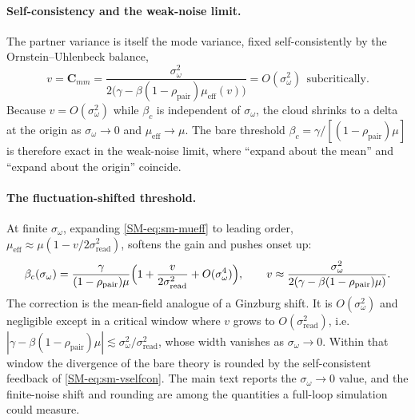 \documentclass[
  aps,prx,
  preprint,
  superscriptaddress,
  nofootinbib
]{revtex4-2}
\newcommand{\C}{\mathbf{C}}
\newcommand{\sread}{\sigma_{\mathrm{read}}}
\newcommand{\sidn}{\sigma_{\omega}}
\begin{document}
\paragraph{Self-consistency and the weak-noise limit.} The partner variance is itself the mode variance, fixed self-consistently by the Ornstein--Uhlenbeck balance,
\begin{equation}\label{SM-eq:sm-vselfcon}
v=\C_{mm}=\frac{\sidn^2}{2\bigl(\gamma-\beta(1-\rho_{\mathrm{pair}})\mu_{\mathrm{eff}}(v)\bigr)}=O(\sidn^2)\ \ \text{subcritically.}
\end{equation}
Because $v=O(\sidn^2)$ while $\beta_c$ is independent of $\sidn$, the cloud shrinks to a delta at the origin as $\sidn\to0$ and $\mu_{\mathrm{eff}}\to\mu$. The bare threshold $\beta_c=\gamma/[(1-\rho_{\mathrm{pair}})\mu]$ is therefore exact in the weak-noise limit, where ``expand about the mean'' and ``expand about the origin'' coincide.

\paragraph{The fluctuation-shifted threshold.} At finite $\sidn$, expanding \cref{SM-eq:sm-mueff} to leading order, $\mu_{\mathrm{eff}}\approx\mu(1-v/2\sread^2)$, softens the gain and pushes onset up:
\begin{equation}\label{SM-eq:sm-shift}
\beta_c(\sidn)=\frac{\gamma}{(1-\rho_{\mathrm{pair}})\mu}\Bigl(1+\frac{v}{2\sread^2}+O(\sidn^4)\Bigr),\qquad v\approx\frac{\sidn^2}{2(\gamma-\beta(1-\rho_{\mathrm{pair}})\mu)}.
\end{equation}
The correction is the mean-field analogue of a Ginzburg shift. It is $O(\sidn^2)$ and negligible except in a critical window where $v$ grows to $O(\sread^2)$, i.e.\ $|\gamma-\beta(1-\rho_{\mathrm{pair}})\mu|\lesssim\sidn^2/\sread^2$, whose width vanishes as $\sidn\to0$. Within that window the divergence of the bare theory is rounded by the self-consistent feedback of \cref{SM-eq:sm-vselfcon}. The main text reports the $\sidn\to0$ value, and the finite-noise shift and rounding are among the quantities a full-loop simulation could measure.
\end{document}
